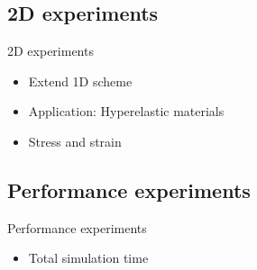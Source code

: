 \subsection{2D experiments}
\begin{frame}{2D experiments}
    \begin{itemize}
        \item Extend 1D scheme
        \item Application: Hyperelastic materials
        \item Stress and strain
    \end{itemize}
\end{frame}

\subsection{Performance experiments}
\begin{frame}{Performance experiments}
    \begin{itemize}
        \item Total simulation time
    \end{itemize}
\end{frame}


